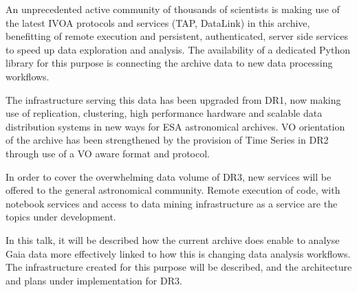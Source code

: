 \documentclass{report}
\begin{document}
An unprecedented active community of thousands of scientists is making use of the latest IVOA protocols and services (TAP, DataLink) in this archive, benefitting of remote execution and persistent, authenticated, server side services to speed up data exploration and analysis. The availability of a dedicated Python library for this purpose is connecting the archive data to new data processing workflows.

The infrastructure serving this data has been upgraded from DR1, now making use of replication, clustering, high performance hardware and scalable data distribution systems in new ways for ESA astronomical archives. VO orientation of the archive has been strengthened by the provision of Time Series in DR2 through use of a VO aware format and protocol.

In order to cover the overwhelming data volume of DR3, new services will be offered to the general astronomical community. Remote execution of code, with notebook services and access to data mining infrastructure as a service are the topics under development.

In this talk, it will be described how the current archive does enable to analyse Gaia data more effectively linked to how this is changing data analysis workflows. The infrastructure created for this purpose will be described, and the architecture and plans under implementation for DR3.\newline
\newpage
\end{document}
